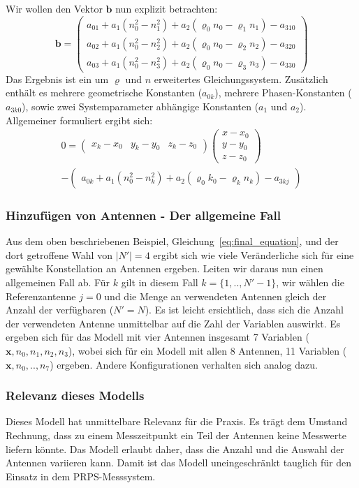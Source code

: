 {%
Wir wollen den Vektor $\mathbf{b}$ nun explizit betrachten: %
%
\begin{equation}
\mathbf{b}=
\left(
	\begin{array}{c}
		a_{01}+a_1( n_0^2-n_1^2)+a_2(\varrho_0n_0-\varrho_1n_1)-a_{310} \\
		a_{02}+a_1(n_0^2-n_2^2)+a_2(\varrho_0n_0-\varrho_2n_2)-a_{320} \\
		a_{03}+a_1(n_0^2-n_3^2)+a_2(\varrho_0n_0-\varrho_3n_3)-a_{330}
	\end{array}
\right)
\end{equation}
%
Das Ergebnis ist ein um $\varrho$ und $n$ erweitertes Gleichungssystem. Zusätzlich enthält  es mehrere geometrische Konstanten ($a_{0k}$), mehrere Phasen-Konstanten ($a_{3k0}$), sowie zwei Systemparameter abhängige Konstanten ($a_1$ und $a_2$). Allgemeiner formuliert ergibt sich:
%
\begin{multline}\label{eq:final_equation}
0=
\left(
	\begin{array}{ccc}
		x_k-x_0 & y_k-y_0 & z_k-z_0 
	\end{array}
\right)
\left(
   \begin{array}{c}
	   x-x_0\\
	   y-y_0\\
	   z-z_0
   \end{array}
\right) \\
-
\left(
	\begin{array}{c}
		a_{0k}+a_1(n_0^2-n_k^2)+a_2(\varrho_0k_0-\varrho_kn_k)-a_{3kj}
	\end{array}
	\right)
\end{multline}
%
\subsubsection{Hinzufügen von Antennen - Der allgemeine Fall}
Aus dem oben beschriebenen Beispiel, Gleichung~\eqref{eq:final_equation}, und der dort getroffene Wahl von $|N'|=4$ ergibt sich wie viele Veränderliche sich für eine gewählte Konstellation an Antennen ergeben. Leiten wir daraus nun einen allgemeinen Fall ab. Für $k$ gilt in diesem Fall $k=\{1,..,N'-1\}$, wir wählen die Referenzantenne $j=0$ und die Menge an verwendeten Antennen gleich der Anzahl der verfügbaren ($N'=N$). Es ist leicht ersichtlich, dass sich die Anzahl der verwendeten Antenne unmittelbar auf die Zahl der Variablen auswirkt. Es ergeben sich für das Modell mit vier Antennen insgesamt 7 Variablen ($\mathbf{x},n_0,n_1,n_2,n_3$), wobei sich für ein Modell mit allen 8 Antennen, 11 Variablen ($\mathbf{x},n_0,..,n_7$) ergeben. Andere Konfigurationen verhalten sich analog dazu.
%
\subsubsection{Relevanz dieses Modells}
Dieses Modell hat unmittelbare Relevanz für die Praxis. Es trägt dem Umstand Rechnung, dass zu einem Messzeitpunkt ein Teil der Antennen keine Messwerte liefern könnte. Das Modell erlaubt daher, dass die Anzahl und die Auswahl der Antennen variieren kann. Damit ist das Modell uneingeschränkt tauglich für den Einsatz in dem PRPS-Messsystem.\\
}